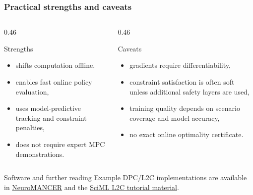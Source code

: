 \begin{frame}
	\frametitle{Practical strengths and caveats}
	\begin{columns}[T,totalwidth=\textwidth]
		\begin{column}{0.46\textwidth}
			\begin{block}{Strengths}
				\begin{itemize}
					\item shifts computation offline,
					\item enables fast online policy evaluation,
					\item uses model-predictive tracking and constraint penalties,
					\item does not require expert MPC demonstrations.
				\end{itemize}
			\end{block}\pause%
		\end{column}
		\hspace{0.04\textwidth}
		\begin{column}{0.46\textwidth}
			\begin{block}{Caveats}
				\begin{itemize}
					\item gradients require differentiability,
					\item constraint satisfaction is often soft unless additional safety layers are used,
					\item training quality depends on scenario coverage and model accuracy,
					\item no exact online optimality certificate.
				\end{itemize}
			\end{block}\pause%
		\end{column}
	\end{columns}
	\vspace{2mm}
	\begin{block}{Software and further reading}
		Example DPC/L2C implementations are available in \href{https://github.com/pnnl/neuromancer}{NeuroMANCER} and the \href{https://sciml-l4dc2026.github.io/SciML-L4DC2026}{SciML L2C tutorial material}.
	\end{block}
\end{frame}


